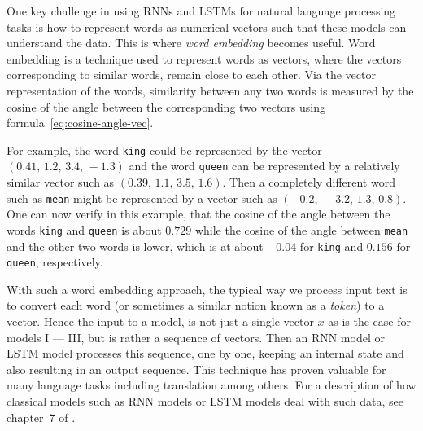 One key challenge in using RNNs and LSTMs for natural language processing tasks is how to represent words as numerical vectors such that these models can understand the data. This is where {\em word embedding} becomes useful. Word embedding is a technique used to represent words as vectors, where the vectors corresponding to similar words, remain close to each other. Via the vector representation of the words, similarity between any two words is measured by the cosine of the angle between the corresponding two vectors using formula~\eqref{eq:cosine-angle-vec}.  

For example, the word \texttt{king} could be represented by the vector $(0.41, \, 1.2,\, 3.4, \,-1.3)$ and the word \texttt{queen} can be represented by a relatively similar vector such as $(0.39, \, 1.1, \, 3.5, \, 1.6)$. Then a completely different word such as \texttt{mean} might be represented by a vector such as $(-0.2,\, -3.2,\, 1.3,\, 0.8)$. One can now verify in this example, that the cosine of the angle between the words \texttt{king} and \texttt{queen} is about $0.729$ while the cosine of the angle between \texttt{mean} and the other two words is lower, which is at about $-0.04$ for \texttt{king} and $0.156$ for \texttt{queen}, respectively. 

With such a word embedding approach, the typical way we process input text is to convert each word (or sometimes a similar notion known as a {\em token}) to a vector. Hence the input to a model, is not just a single vector $x$ as is the case for models I --- III, but is rather a sequence of vectors. Then an RNN model or LSTM model processes this sequence, one by one, keeping an internal state and also resulting in an output sequence. This technique has proven valuable for many language tasks including translation among others. For a description of how classical models such as RNN models or LSTM models deal with such data,  see chapter~7 of \cite{LiquetMokaNazarathy2024DeepLearning}.

